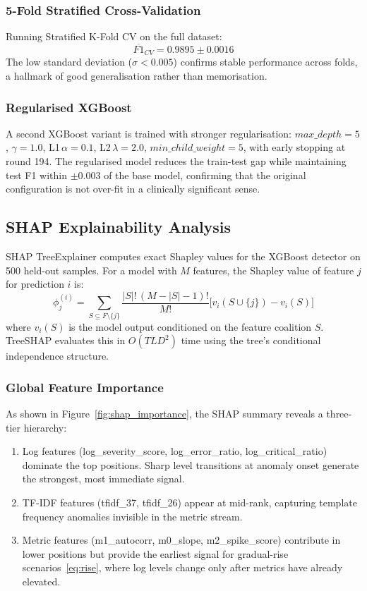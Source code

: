 \documentclass[5p, times]{elsarticle}
\begin{document}
\subsubsection{5-Fold Stratified Cross-Validation}
Running Stratified K-Fold CV on the full dataset:
\begin{equation}
    \overline{F1}_{CV} = 0.9895 \pm 0.0016
\end{equation}
The low standard deviation ($\sigma<0.005$) confirms stable performance across folds, a hallmark of good generalisation rather than memorisation.

\subsubsection{Regularised XGBoost}
A second XGBoost variant is trained with stronger regularisation: $max\_depth=5$, $\gamma=1.0$, L1\,$\alpha=0.1$,
L2\,$\lambda=2.0$, $min\_child\_weight=5$, with early
stopping at round 194. The regularised model reduces the train-test gap while maintaining test F1 within $\pm0.003$ of the base model, confirming that the original configuration is not over-fit in a
clinically significant sense.

\subsection{SHAP Explainability Analysis}

SHAP TreeExplainer computes exact Shapley values for the XGBoost
detector on 500 held-out samples. For a model with $M$ features,
the Shapley value of feature $j$ for prediction $i$ is:
\begin{equation}
    \phi_j^{(i)} = \sum_{S \subseteq F \setminus \{j\}}
    \frac{|S|!\,(M-|S|-1)!}{M!}
    \bigl[v_i(S\cup\{j\}) - v_i(S)\bigr]
\end{equation}
where $v_i(S)$ is the model output conditioned on the feature
coalition $S$. TreeSHAP evaluates this in $O(TLD^2)$ time using
the tree's conditional independence structure.

\subsubsection{Global Feature Importance}
As shown in Figure~\ref{fig:shap_importance}, the SHAP summary reveals a three-tier hierarchy:

\begin{enumerate}[leftmargin=*, topsep=2pt, itemsep=1pt]
    \item Log features (log\_severity\_score, log\_error\_ratio, log\_critical\_ratio) dominate the top positions. Sharp level transitions at anomaly onset generate the strongest, most immediate signal.
    \item TF-IDF features (tfidf\_37,
    tfidf\_26) appear at mid-rank, capturing template
    frequency anomalies invisible in the metric stream.
    \item Metric features (m1\_autocorr, m0\_slope, m2\_spike\_score) contribute in lower positions but provide the earliest signal for gradual-rise scenarios~\eqref{eq:rise}, where log levels change only after metrics have already elevated.
\end{enumerate}
\end{document}
